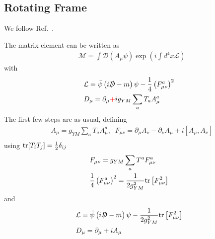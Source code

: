 \subsection{\label{sec:RotatingFrame}Rotating Frame}

We follow Ref.~\cite{rotation}.

The matrix element can be written as
\begin{equation}
\begin{split}
&\mathcal{M}=\int \mathcal{D}(A_{\mu}\psi)\exp \left(i\int d^4x \mathcal{L}\right)
\end{split}
\end{equation}
with
\begin{equation}
\begin{split}
&\mathcal{L}=\bar{\psi}\left(i\slashed {D}-m\right)\psi-\frac{1}{4}\left(F^a_{\mu\nu}\right)^2\\
&D_{\mu}=\partial _{\mu}\textcolor[rgb]{1,0,0}{+}ig_{YM}\sum _a T_aA^a_{\mu}\\
\end{split}
\end{equation}
The first few steps are as usual, defining
\begin{equation}
\begin{split}
&A_{\mu}=g_{YM}\sum _a T_aA^a_{\mu},\;\;F_{\mu\nu}=\partial _{\mu}A_{\nu}-\partial _{\nu}A_{\mu}+i[A_{\mu},A_{\nu}]\\
\end{split}
\end{equation}
using ${\rm tr}[T_iT_j]=\frac{1}{2}\delta _{ij}$
\begin{equation}
\begin{split}
&F_{\mu\nu}=g_{YM}\sum _aT^a F^a_{\mu\nu}\\
&\frac{1}{4}\left(F^a_{\mu\nu}\right)^2=\frac{1}{2g_{YM}^2}{\rm tr}\left[F_{\mu\nu}^2\right]\\
\end{split}
\end{equation}
and
\begin{equation}
\begin{split}
&\mathcal{L}=\bar{\psi}\left(i\slashed {D}-m\right)\psi-\frac{1}{2g_{YM}^2}{\rm tr}\left[F_{\mu\nu}^2\right]\\
&D_{\mu}=\partial _{\mu}+iA_{\mu}\\
\end{split}
\end{equation}

